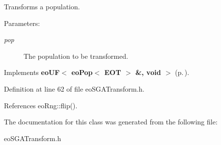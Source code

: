 Transforms a population. 

\begin{Desc}
\item[Parameters:]
\begin{description}
\item[{\em pop}]The population to be transformed. \end{description}
\end{Desc}


Implements {\bf eo\-UF$<$ eo\-Pop$<$ EOT $>$ \&, void $>$} {\rm (p.\,\pageref{classeo_u_f_a1})}.

Definition at line 62 of file eo\-SGATransform.h.

References eo\-Rng::flip().

The documentation for this class was generated from the following file:\begin{CompactItemize}
\item 
eo\-SGATransform.h\end{CompactItemize}
